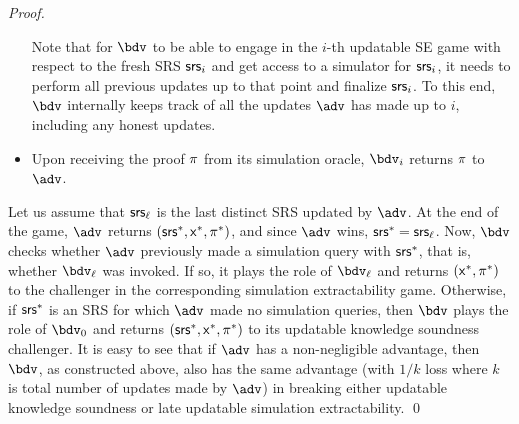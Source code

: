 \begin{proof}
\begin{itemize}
		Note that for $\bdv$ to be able to engage in the $i$-th updatable SE game with respect to the fresh SRS $\mathsf{srs}_{i}$ and get access to a simulator for $\mathsf{srs}_{i}$, it needs to perform all previous updates up to that point and finalize $\mathsf{srs}_{i}$. To this end, $\bdv$  internally keeps track of all the updates $\advse$ has made up to $i$, including any honest updates.
		
		\item
		Upon receiving the proof $\pi$ from its simulation oracle, $\bdv_i$ returns $\pi$ to $\advse$.
		
	\end{itemize}
	
	
	Let us assume that $\mathsf{srs}_\ell$ is the last distinct SRS updated by $\advse$. 
	At the end of the game, $\advse$ returns $(\mathsf{srs}^*, \mathsf{x}^*, \pi^*)$, and since $\advse$ wins, $\mathsf{srs}^* = \mathsf{srs}_\ell$. Now, $\bdv$ checks whether 
	$\advse$ previously made a simulation query with
	$\mathsf{srs}^*$, that is, whether $\bdv_\ell$ was invoked. 
	If so, it plays the role of $\bdv_\ell$ and returns $(\mathsf{x}^*, \pi^*)$ to the challenger in the corresponding simulation extractability game. 
	Otherwise, if $\mathsf{srs}^*$ is an SRS for which $\advse$ made no simulation queries, then $\bdv$ plays the role of $\bdv_0$ and returns $(\mathsf{srs}^*, \mathsf{x}^*, \pi^*)$ to its updatable knowledge soundness challenger. It is easy to see that if $\advse$ has a non-negligible advantage, then $\bdv$, as constructed above, also has the same advantage (with $1/k$ loss where $k$ is total number of updates made by $\advse$) in breaking either updatable knowledge soundness or late updatable simulation extractability.
\qed
\end{proof}